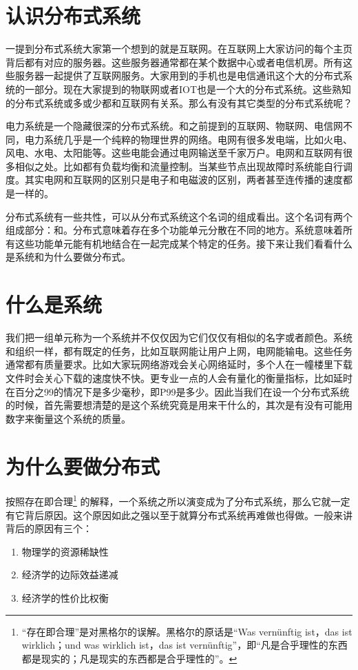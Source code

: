 
\section{认识分布式系统}

一提到分布式系统大家第一个想到的就是互联网。在互联网上大家访问的每个主页背后都有对应的服务器。这些服务器通常都在某个数据中心或者电信机房。所有这些服务器一起提供了互联网服务。大家用到的手机也是电信通讯这个大的分布式系统的一部分。现在大家提到的物联网或者IOT也是一个大的分布式系统。这些熟知的分布式系统或多或少都和互联网有关系。那么有没有其它类型的分布式系统呢？


电力系统是一个隐藏很深的分布式系统。和之前提到的互联网、物联网、电信网不同，电力系统几乎是一个纯粹的物理世界的网络。电网有很多发电端，比如火电、风电、水电、太阳能等。这些电能会通过电网输送至千家万户。电网和互联网有很多相似之处。比如都有负载均衡和流量控制。当某些节点出现故障时系统能自行调度。其实电网和互联网的区别只是电子和电磁波的区别，两者甚至连传播的速度都是一样的。


分布式系统有一些共性，可以从分布式系统这个名词的组成看出。这个名词有两个组成部分：和。分布式意味着存在多个功能单元分散在不同的地方。系统意味着所有这些功能单元能有机地结合在一起完成某个特定的任务。接下来让我们看看什么是系统和为什么要做分布式。

\section{什么是系统}

我们把一组单元称为一个系统并不仅仅因为它们仅仅有相似的名字或者颜色。系统和组织一样，都有既定的任务，比如互联网能让用户上网，电网能输电。这些任务通常都有质量要求。比如大家玩网络游戏会关心网络延时，多个人在一幢楼里下载文件时会关心下载的速度快不快。更专业一点的人会有量化的衡量指标，比如延时在百分之99的情况下是多少毫秒，即P99是多少。因此当我们在设一个分布式系统的时候，首先需要想清楚的是这个系统究竟是用来干什么的，其次是有没有可能用数字来衡量这个系统的质量。


\section{为什么要做分布式}

按照存在即合理\footnote{“存在即合理”是对黑格尔的误解。黑格尔的原话是“Was vernünftig ist，das ist wirklich；und was wirklich ist，das ist vernünftig”，即“凡是合乎理性的东西都是现实的；凡是现实的东西都是合乎理性的”。} 的解释，一个系统之所以演变成为了分布式系统，那么它就一定有它背后原因。这个原因如此之强以至于就算分布式系统再难做也得做。一般来讲背后的原因有三个：
\begin{enumerate}
    \item 物理学的资源稀缺性
    \item 经济学的边际效益递减
    \item 经济学的性价比权衡
\end{enumerate}


